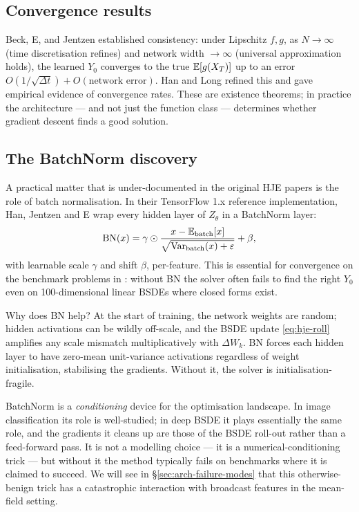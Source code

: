 \subsection{Convergence results}

Beck, E, and Jentzen \cite{beck2019} established consistency: under Lipschitz $f, g$, as $N \to \infty$ (time discretisation refines) and network width $\to \infty$ (universal approximation holds), the learned $Y_0$ converges to the true $\mathbb{E}[g(X_T)]$ up to an error $O(1/\sqrt{\Delta t}) + O(\text{network error})$. Han and Long \cite{han2020} refined this and gave empirical evidence of convergence rates. These are existence theorems; in practice the architecture --- and not just the function class --- determines whether gradient descent finds a good solution.

\subsection{The BatchNorm discovery}
\label{subsec:batchnorm-discovery}

A practical matter that is under-documented in the original HJE papers is the role of batch normalisation. In their TensorFlow 1.x reference implementation, Han, Jentzen and E wrap every hidden layer of $Z_\theta$ in a BatchNorm layer:
\[
  \mathrm{BN}(x) = \gamma \odot \frac{x - \mathbb{E}_{\text{batch}}[x]}{\sqrt{\mathrm{Var}_{\text{batch}}(x) + \varepsilon}} + \beta,
\]
with learnable scale $\gamma$ and shift $\beta$, per-feature. This is essential for convergence on the benchmark problems in \cite{han2018}: without BN the solver often fails to find the right $Y_0$ even on 100-dimensional linear BSDEs where closed forms exist.

Why does BN help? At the start of training, the network weights are random; hidden activations can be wildly off-scale, and the BSDE update \eqref{eq:hje-roll} amplifies any scale mismatch multiplicatively with $\Delta W_k$. BN forces each hidden layer to have zero-mean unit-variance activations regardless of weight initialisation, stabilising the gradients. Without it, the solver is initialisation-fragile.

\begin{intuition}
BatchNorm is a \emph{conditioning} device for the optimisation landscape. In image classification its role is well-studied; in deep BSDE it plays essentially the same role, and the gradients it cleans up are those of the BSDE roll-out rather than a feed-forward pass. It is not a modelling choice --- it is a numerical-conditioning trick --- but without it the method typically fails on benchmarks where it is claimed to succeed. We will see in \S\ref{sec:arch-failure-modes} that this otherwise-benign trick has a catastrophic interaction with broadcast features in the mean-field setting.
\end{intuition}

